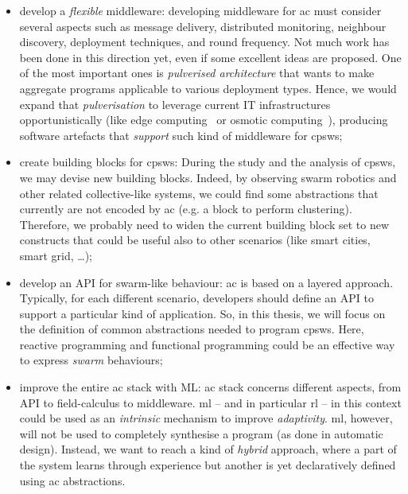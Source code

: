 \documentclass[11pt]{article}
\begin{document}
\begin{itemize}
	\item develop a \textit{flexible} middleware: 
	developing middleware for \ac{ac} must consider several aspects such as message delivery, distributed monitoring, neighbour discovery, deployment techniques, and round frequency. 
	Not much work has been done in this direction yet, even if some excellent ideas are proposed. 
	One of the most important ones is \emph{pulverised architecture}\cite{DBLP:journals/fi/CasadeiPPVW20} that wants to make aggregate programs applicable to various deployment types.
	Hence, we would expand that \emph{pulverisation} to leverage current IT infrastructures opportunistically (like edge computing~\cite{DBLP:journals/computer/Satyanarayanan17} or osmotic computing~\cite{DBLP:journals/cloudcomp/VillariFDRR16}), producing software artefacts that \textit{support} such kind of middleware for \acp{cpsw};
	\item create building blocks for \acp{cpsw}: During the study and the analysis of \acp{cpsw}, we may devise new building blocks. 
	Indeed, by observing swarm robotics and other related collective-like systems, we could find some abstractions that currently are not encoded by \ac{ac} (e.g. a block to perform clustering).
	Therefore, we probably need to widen the current building block set to new constructs that could be useful also to other scenarios (like smart cities, smart grid, \dots{});
	\item develop an API for swarm-like behaviour: \ac{ac} is based on a layered approach. 
	Typically, for each different scenario, developers should define an API to support a particular kind of application. 
	So, in this thesis, we will focus on the definition of common abstractions needed to program \acp{cpsw}. 
	Here, reactive programming and functional programming could be an effective way to express \textit{swarm} behaviours; %
	\item improve the entire \ac{ac} stack with ML: \ac{ac} stack concerns different aspects, from API to field-calculus to middleware. 
	\ac{ml} -- and in particular \ac{rl} -- in this context could be used as an \emph{intrinsic} mechanism to improve \emph{adaptivity}. 
	\ac{ml}, however, will not be used to completely synthesise a program (as done in automatic design). Instead, we want to reach a kind of \textit{hybrid} approach, where a part of the system learns through experience but another is yet declaratively defined using \ac{ac} abstractions.
\end{itemize}
\end{document}
